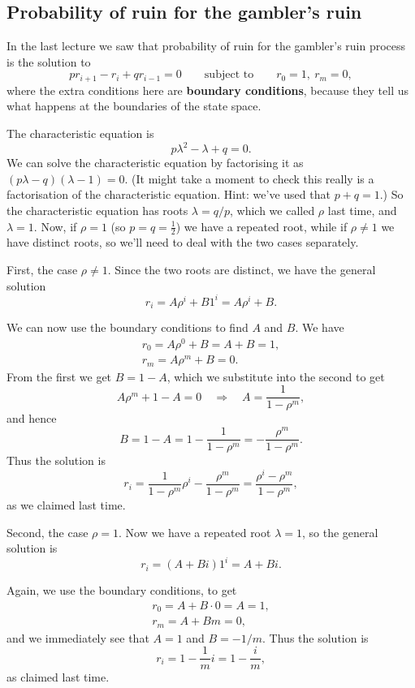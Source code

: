 \documentclass[
  a4paper,
]{article}
\theoremstyle{definition}
\theoremstyle{definition}
\theoremstyle{definition}
\theoremstyle{remark}
\begin{document}
\hypertarget{ruin-probability-solve}{%
\subsection{Probability of ruin for the gambler's ruin}\label{ruin-probability-solve}}

In the last lecture we saw that probability of ruin for the gambler's ruin process is the solution to
\[ pr_{i+1} - r_i + qr_{i-1} = 0 \qquad \text{subject to} \qquad r_0 = 1,\ r_m = 0 , \]
where the extra conditions here are \textbf{boundary conditions}, because they tell us what happens at the boundaries of the state space.

The characteristic equation is
\[ p\lambda^2 - \lambda + q = 0 .\]
We can solve the characteristic equation by factorising it as \((p \lambda - q)(\lambda - 1) = 0\). (It might take a moment to check this really is a factorisation of the characteristic equation. Hint: we've used that \(p+q=1\).) So the characteristic equation has roots \(\lambda = q/p\), which we called \(\rho\) last time, and \(\lambda = 1\). Now, if \(\rho = 1\) (so \(p = q = \frac12\)) we have a repeated root, while if \(\rho \neq 1\) we have distinct roots, so we'll need to deal with the two cases separately.

First, the case \(\rho \neq 1\). Since the two roots are distinct, we have the general solution
\[ r_i = A\rho^i + B1^i = A\rho^i + B . \]

We can now use the boundary conditions to find \(A\) and \(B\). We have
\begin{gather*} r_0 = A \rho^0 + B = A+B = 1, \\
                r_m = A \rho^m + B = 0 . \end{gather*}
From the first we get \(B = 1-A\), which we substitute into the second to get
\[ A\rho^m + 1 - A = 0 \quad \Rightarrow \quad A = \frac{1}{1-\rho^m} , \]
and hence
\[ B = 1 - A = 1 - \frac{1}{1-\rho^m} = - \frac{\rho^m}{1 - \rho^m} . \]
Thus the solution is
\[ r_i = \frac{1}{1-\rho^m} \rho^i -  \frac{\rho^m}{1 - \rho^m} = \frac{\rho^i - \rho^m}{1 - \rho^m}  , \]
as we claimed last time.

Second, the case \(\rho = 1\). Now we have a repeated root \(\lambda = 1\), so the general solution is
\[ r_i = (A + Bi) 1^i = A+Bi . \]

Again, we use the boundary conditions, to get
\begin{gather*} r_0 = A + B\cdot 0 = A = 1, \\
r_m = A + Bm = 0 , \end{gather*}
and we immediately see that \(A = 1\) and \(B = -1/m\). Thus the solution is
\[ r_i = 1 - \frac{1}{m}i = 1 - \frac{i}{m} , \]
as claimed last time.
\end{document}
